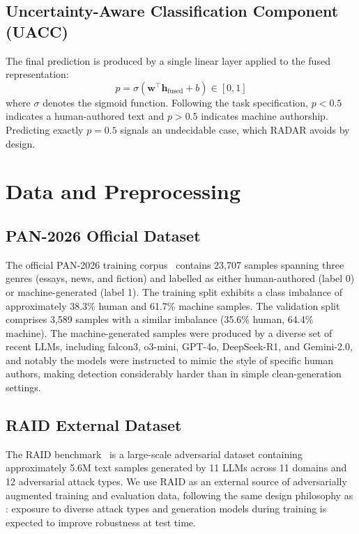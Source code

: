 \documentclass[]{ceurart}
\begin{document}
\subsection{Uncertainty-Aware Classification Component (UACC)}

The final prediction is produced by a single linear layer applied to the fused representation:
\begin{equation}
  p = \sigma(\mathbf{w}^\top \mathbf{h}_\text{fused} + b) \in [0,1]
\end{equation}
where $\sigma$ denotes the sigmoid function. Following the task specification, $p < 0.5$ indicates a human-authored text and $p > 0.5$ indicates machine authorship. Predicting exactly $p = 0.5$ signals an undecidable case, which RADAR avoids by design.


\section{Data and Preprocessing}

\subsection{PAN-2026 Official Dataset}

The official PAN-2026 training corpus~\cite{bevendorff:2025} contains 23,707 samples spanning three genres (essays, news, and fiction) and labelled as either human-authored (label 0) or machine-generated (label 1). The training split exhibits a class imbalance of approximately 38.3\% human and 61.7\% machine samples. The validation split comprises 3,589 samples with a similar imbalance (35.6\% human, 64.4\% machine). The machine-generated samples were produced by a diverse set of recent LLMs, including falcon3, o3-mini, GPT-4o, DeepSeek-R1, and Gemini-2.0, and notably the models were instructed to mimic the style of specific human authors, making detection considerably harder than in simple clean-generation settings.

\subsection{RAID External Dataset}

The RAID benchmark~\cite{dugan:2024} is a large-scale adversarial dataset containing approximately 5.6M text samples generated by 11 LLMs across 11 domains and 12 adversarial attack types. We use RAID as an external source of adversarially augmented training and evaluation data, following the same design philosophy as \citet{bevendorff:2025b}: exposure to diverse attack types and generation models during training is expected to improve robustness at test time.
\end{document}
